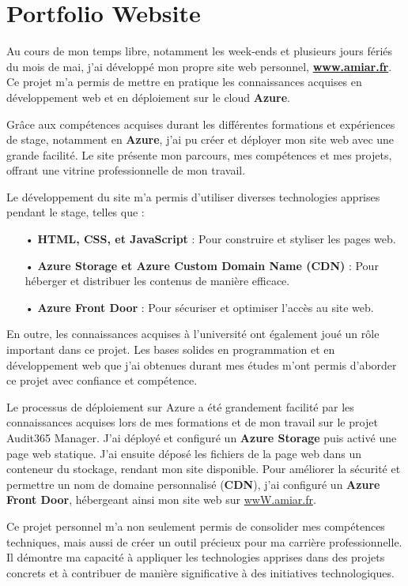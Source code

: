 \section{Portfolio Website}

Au cours de mon temps libre, notamment les week-ends et plusieurs jours fériés du mois de mai, j'ai développé mon propre site web personnel, \textbf{\href{https://www.amiar.fr/}{www.amiar.fr}}. Ce projet m'a permis de mettre en pratique les connaissances acquises en développement web et en déploiement sur le cloud \textbf{Azure}.

Grâce aux compétences acquises durant les différentes formations et expériences de stage, notamment en \textbf{Azure}, j'ai pu créer et déployer mon site web avec une grande facilité. Le site présente mon parcours, mes compétences et mes projets, offrant une vitrine professionnelle de mon travail.

Le développement du site m'a permis d'utiliser diverses technologies apprises pendant le stage, telles que :

\begin{itemize}
    \item[•] \textbf{HTML, CSS, et JavaScript} : Pour construire et styliser les pages web.
    \item[•] \textbf{Azure Storage et Azure Custom Domain Name (CDN)} : Pour héberger et distribuer les contenus de manière efficace.
    \item[•] \textbf{Azure Front Door} : Pour sécuriser et optimiser l'accès au site web.
\end{itemize}

En outre, les connaissances acquises à l'université ont également joué un rôle important dans ce projet. Les bases solides en programmation et en développement web que j'ai obtenues durant mes études m'ont permis d'aborder ce projet avec confiance et compétence.

Le processus de déploiement sur Azure a été grandement facilité par les connaissances acquises lors de mes formations et de mon travail sur le projet Audit365 Manager. J'ai déployé et configuré un \textbf{Azure Storage} puis activé une page web statique. J'ai ensuite déposé les fichiers de la page web dans un conteneur du stockage, rendant mon site disponible. Pour améliorer la sécurité et permettre un nom de domaine personnalisé (\textbf{CDN}), j'ai configuré un \textbf{Azure Front Door}, hébergeant ainsi mon site web sur \href{https://www.amiar.fr/}{wwW.amiar.fr}.


Ce projet personnel m'a non seulement permis de consolider mes compétences techniques, mais aussi de créer un outil précieux pour ma carrière professionnelle. Il démontre ma capacité à appliquer les technologies apprises dans des projets concrets et à contribuer de manière significative à des initiatives technologiques.


